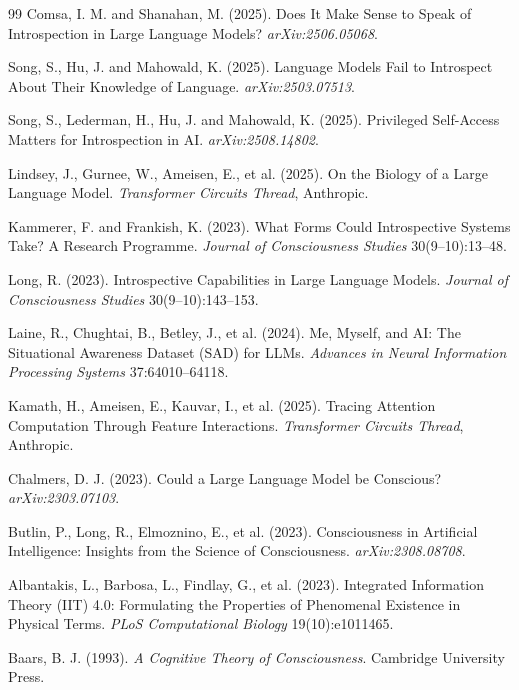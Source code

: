 \begin{thebibliography}{99}
Comsa, I. M. and Shanahan, M. (2025). Does It Make Sense to Speak of
Introspection in Large Language Models? \textit{arXiv:2506.05068}.

Song, S., Hu, J. and Mahowald, K. (2025). Language Models Fail to Introspect
About Their Knowledge of Language. \textit{arXiv:2503.07513}.

Song, S., Lederman, H., Hu, J. and Mahowald, K. (2025). Privileged Self-Access
Matters for Introspection in AI. \textit{arXiv:2508.14802}.

Lindsey, J., Gurnee, W., Ameisen, E., et al. (2025). On the Biology of a Large
Language Model. \textit{Transformer Circuits Thread}, Anthropic.

Kammerer, F. and Frankish, K. (2023). What Forms Could Introspective Systems
Take? A Research Programme. \textit{Journal of Consciousness Studies} 30(9--10):13--48.

Long, R. (2023). Introspective Capabilities in Large Language Models.
\textit{Journal of Consciousness Studies} 30(9--10):143--153.

Laine, R., Chughtai, B., Betley, J., et al. (2024). Me, Myself, and AI: The
Situational Awareness Dataset (SAD) for LLMs. \textit{Advances in Neural
Information Processing Systems} 37:64010--64118.

Kamath, H., Ameisen, E., Kauvar, I., et al. (2025). Tracing Attention
Computation Through Feature Interactions. \textit{Transformer Circuits Thread},
Anthropic.

Chalmers, D. J. (2023). Could a Large Language Model be Conscious?
\textit{arXiv:2303.07103}.

Butlin, P., Long, R., Elmoznino, E., et al. (2023). Consciousness in Artificial
Intelligence: Insights from the Science of Consciousness.
\textit{arXiv:2308.08708}.

Albantakis, L., Barbosa, L., Findlay, G., et al. (2023). Integrated Information
Theory (IIT) 4.0: Formulating the Properties of Phenomenal Existence in
Physical Terms. \textit{PLoS Computational Biology} 19(10):e1011465.

Baars, B. J. (1993). \textit{A Cognitive Theory of Consciousness}. Cambridge
University Press.


\end{thebibliography}
